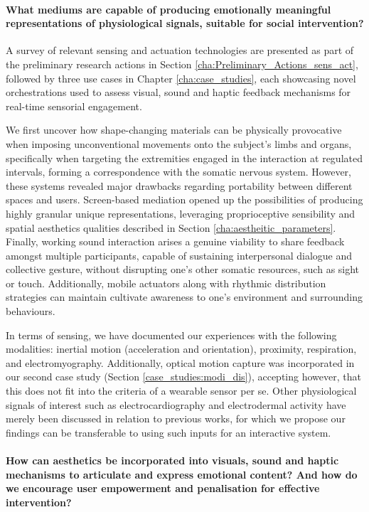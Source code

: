 \paragraph{What mediums are capable of producing emotionally meaningful representations of physiological signals, suitable for social intervention?}

A survey of relevant sensing and actuation technologies are presented as part of the preliminary research actions in Section \ref{cha:Preliminary_Actions_sens_act}, followed by three use cases in Chapter \ref{cha:case_studies}, each showcasing novel orchestrations used to assess visual, sound and haptic feedback mechanisms for real-time sensorial engagement. 

We first uncover how shape-changing materials can be physically provocative when imposing unconventional movements onto the subject's limbs and organs, specifically when targeting the extremities engaged in the interaction at regulated intervals, forming a correspondence with the somatic nervous system. However, these systems revealed major drawbacks regarding portability between different spaces and users. Screen-based mediation opened up the possibilities of producing highly granular unique representations, leveraging proprioceptive sensibility and spatial aesthetics qualities described in Section \ref{cha:aestheitic_parameters}. Finally, working sound interaction arises a genuine viability to share feedback amongst multiple participants, capable of sustaining interpersonal dialogue and collective gesture, without disrupting one's other somatic resources, such as sight or touch. Additionally, mobile actuators along with rhythmic distribution strategies can maintain cultivate awareness to one's environment and surrounding behaviours. 

In terms of sensing, we have documented our experiences with the following modalities: inertial motion (acceleration and orientation), proximity, respiration, and electromyography. Additionally, optical motion capture was incorporated in our second case study (Section \ref{case_studies:modi_dis}), accepting however, that this does not fit into the criteria of a wearable sensor per se. Other physiological signals of interest such as electrocardiography and electrodermal activity have merely been discussed in relation to previous works, for which we propose our findings can be transferable to using such inputs for an interactive system.

\paragraph{How can aesthetics be incorporated into visuals, sound and haptic mechanisms to articulate and express emotional content? And how do we encourage user empowerment and penalisation for effective intervention?}
    
